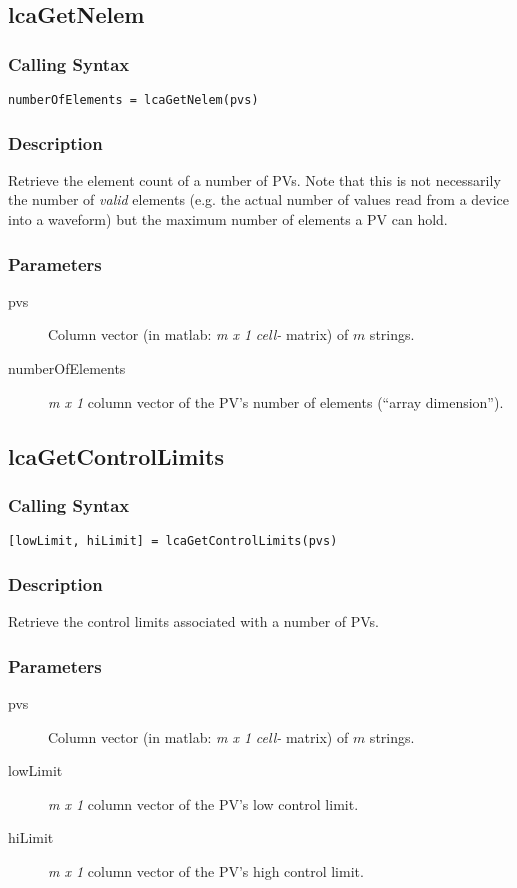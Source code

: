 \documentclass{article}
\newcommand{\ita}[1]{\emph{#1}}
\newcommand{\m}{$m$}
\newcommand{\mhack}{$m$} %
\newcommand{\mxl}{$m\times 1$}
\renewcommand{\m}{\ita{m}}
\newcommand{\mhack}{\ita{m}} %
\renewcommand{\mxl}{\ita{m x 1}}
\newcommand{\PVITEM}{
\item[pvs] Column vector (in matlab: \mxl{} \ita{cell-} matrix)
of \mhack{} strings.
}
\begin{document}
\subsection{lcaGetNelem}
\subsubsection{Calling Syntax}
\begin{verbatim}
numberOfElements = lcaGetNelem(pvs)
\end{verbatim}
\subsubsection{Description}
Retrieve the element count of a number of PVs. Note that this is not
necessarily the number of \ita{valid} elements (e.g. the actual number
of values read from a device into a waveform) but the maximum number
of elements a PV can hold.
\subsubsection{Parameters}
\begin{description}
\PVITEM
\item[numberOfElements] \mxl{} column vector of the PV's number
of elements (``array dimension'').
\end{description}

\subsection{lcaGetControlLimits}
\subsubsection{Calling Syntax}
\begin{verbatim}
[lowLimit, hiLimit] = lcaGetControlLimits(pvs)
\end{verbatim}
\subsubsection{Description}
Retrieve the control limits associated with a number of PVs.
\subsubsection{Parameters}
\begin{description}
\PVITEM
\item[lowLimit] \mxl{} column vector of the PV's low control limit.
\item[hiLimit]  \mxl{} column vector of the PV's high control limit.
\end{description}
\end{document}
